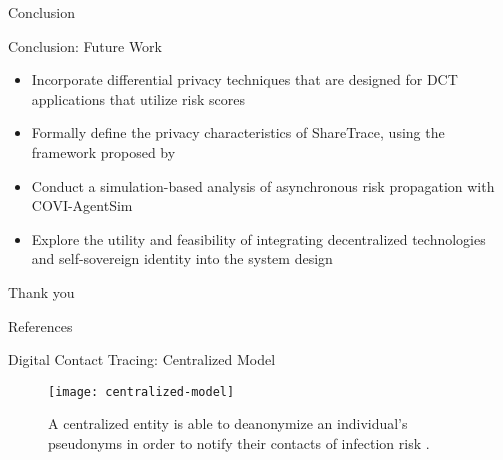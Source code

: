 \documentclass[11pt]{beamer}
\begin{document}
\begin{section}{Conclusion}

\begin{frame}{Conclusion: Future Work}
\begin{itemize}
  \item Incorporate differential privacy techniques that are designed for DCT applications that utilize risk scores \citep{Romijnders2024}
  \pause
  \item Formally define the privacy characteristics of ShareTrace, using the framework proposed by \citet{Kuhn2021}
  \pause
  \item Conduct a simulation-based analysis of asynchronous risk propagation with COVI-AgentSim \citep{Gupta2020}
  \pause
  \item Explore the utility and feasibility of integrating decentralized technologies \citep{Troncoso2017, Trautwein2022, Shi2024, Keizer2024} and self-sovereign identity \citep{Preukschat2021} into the system design
\end{itemize}
\end{frame}

\begin{frame}[c]{ }
  \centering
  \Huge
  Thank you
\end{frame}

\end{section}

\begin{frame}[allowframebreaks]{References}
  \printbibliography
\end{frame}

\appendix

\begin{frame}{Digital Contact Tracing: Centralized Model}
\begin{figure}
  \centering
  \texttt{[image: centralized-model]}
  \caption[Centralized model]{A centralized entity is able to deanonymize an individual's pseudonyms in order to notify their contacts of infection risk \cite{Reichert2021}.}
\end{figure}
\end{frame}
\end{document}
